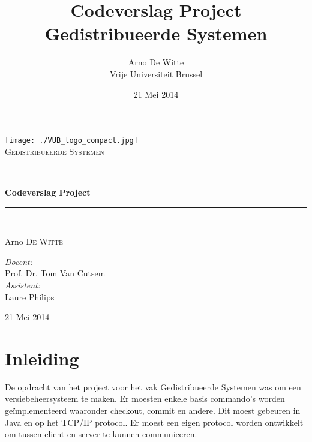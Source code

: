 \documentclass{article}
\title{Codeverslag Project Gedistribueerde Systemen}
\author{Arno De Witte\\
Vrije Universiteit Brussel}
\date{21 Mei 2014}
\newcommand{\HRule}{\rule{\linewidth}{0.5mm}}
\newcommand{\thedate}{21 Mei 2014}
\begin{document}
\begin{titlepage}
\begin{center}

\texttt{[image: ./VUB\_logo\_compact.jpg]}~\\[1cm]


\textsc{\Large Gedistribueerde Systemen}\\[0.5cm]

\HRule \\[0.4cm]
{ \huge \bfseries Codeverslag Project}\\[0.4cm]

\HRule \\[1.5cm]

\begin{minipage}{0.4\textwidth}
\begin{flushleft} \large
Arno \textsc{De Witte}\\
\end{flushleft}
\end{minipage}
\begin{minipage}{0.5\textwidth}
\begin{flushright} \large
\emph{Docent:}\\ Prof. Dr. Tom Van Cutsem\\
\emph{Assistent:}\\ Laure Philips
\end{flushright}
\end{minipage}

\vfill

{\large \thedate}

\end{center}
\end{titlepage}

\newpage
\tableofcontents
\newpage


\section{Inleiding}\label{inleiding}
De opdracht van het project voor het vak Gedistribueerde Systemen was om een versiebeheersysteem te maken. Er moesten enkele basis commando's worden ge\"{i}mplementeerd waaronder checkout, commit en andere. Dit moest gebeuren in Java en op het TCP/IP protocol. Er moest een eigen protocol worden ontwikkelt om tussen client en server te kunnen communiceren.
\end{document}
